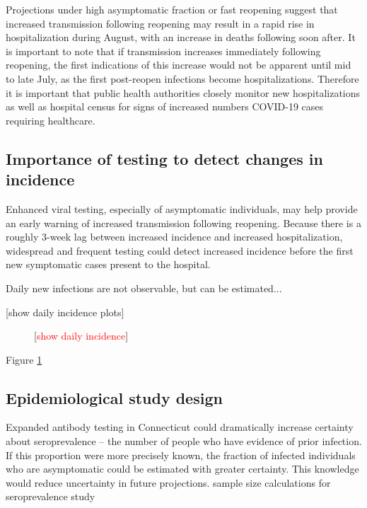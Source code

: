 \documentclass[11pt]{article}
\newcommand{\comment}[1]{[\textcolor{red}{#1}]}
\begin{document}
Projections under high asymptomatic fraction or fast reopening suggest that increased transmission following reopening may result in a rapid rise in hospitalization during August, with an increase in deaths following soon after.  It is important to note that if transmission increases immediately following reopening, the first indications of this increase would not be apparent until mid to late July, as the first post-reopen infections become hospitalizations.  Therefore it is important that public health authorities closely monitor new hospitalizations as well as hospital census for signs of increased numbers COVID-19 cases requiring healthcare.  


\subsection*{Importance of testing to detect changes in incidence}

Enhanced viral testing, especially of asymptomatic individuals, may help provide an early warning of increased transmission following reopening.  Because there is a roughly 3-week lag between increased incidence and increased hospitalization, widespread and frequent testing could detect increased incidence before the first new symptomatic cases present to the hospital. 

Daily new infections are not observable, but can be estimated...

[show daily incidence plots]


\begin{figure}
\centering
\caption{\comment{show daily incidence}}
\label{fig:cumincidence}
\end{figure}

Figure \ref{fig:cumincidence} 



\subsection*{Epidemiological study design}

Expanded antibody testing in Connecticut could dramatically increase certainty about seroprevalence -- the number of people who have evidence of prior infection. If this proportion were more precisely known, the fraction of infected individuals who are asymptomatic could be estimated with greater certainty.  This knowledge would reduce uncertainty in future projections.  
sample size calculations for seroprevalence study
\end{document}
